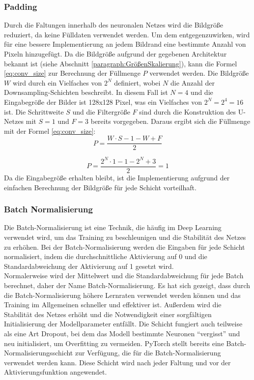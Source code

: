 \subsubsection{Padding}
Durch die Faltungen innerhalb des neuronalen Netzes wird die Bildgröße reduziert, da keine Fülldaten verwendet werden. Um dem entgegenzuwirken, wird für eine bessere Implementierung an jedem Bildrand eine bestimmte Anzahl von Pixeln hinzugefügt. Da die Bildgröße aufgrund der gegebenen Architektur bekannt ist (siehe Abschnitt \ref{paragraph:GrößenSkalierung}), kann die Formel \ref{eq:conv_size} zur Berechnung der Füllmenge $P$ verwendet werden. Die Bildgröße $W$ wird durch ein Vielfaches von $2^N$ definiert, wobei $N$ die Anzahl der Downsampling-Schichten beschreibt. In diesem Fall ist $N=4$ und die Eingabegröße der Bilder ist 128x128 Pixel, was ein Vielfaches von $2^N=2^4=16$ ist. Die Schrittweite $S$ und die Filtergröße $F$ sind durch die Konstruktion des U-Netzes mit $S=1$ und $F=3$ bereits vorgegeben. Daraus ergibt sich die Füllmenge mit der Formel \ref{eq:conv_size}:
\begin{equation}
	P = \dfrac{W \cdot S - 1 - W + F}{2}
\end{equation}

\begin{equation}
	P = \dfrac{2^N \cdot 1 - 1 - 2^N + 3}{2}  = 1
\end{equation}
Da die Eingabegröße erhalten bleibt, ist die Implementierung aufgrund der einfachen Berechnung der Bildgröße für jede Schicht vorteilhaft.

\subsubsection{Batch Normalisierung}
Die Batch-Normalisierung ist eine Technik, die häufig im Deep Learning verwendet wird, um das Training zu beschleunigen und die Stabilität des Netzes zu erhöhen. Bei der Batch-Normalisierung werden die Eingaben für jede Schicht normalisiert, indem die durchschnittliche Aktivierung auf 0 und die Standardabweichung der Aktivierung auf 1 gesetzt wird.\\
Normalerweise wird der Mittelwert und die Standardabweichung für jede Batch berechnet, daher der Name Batch-Normalisierung. Es hat sich gezeigt, dass durch die Batch-Normalisierung höhere Lernraten verwendet werden können und das Training im Allgemeinen schneller und effektiver ist. Außerdem wird die Stabilität des Netzes erhöht und die Notwendigkeit einer sorgfältigen Initialisierung der Modellparameter entfällt. Die Schicht fungiert auch teilweise als eine Art Dropout, bei dem das Modell bestimmte Neuronen ``vergisst'' und neu initialisiert, um Overfitting zu vermeiden.\cite[vgl.][]{Ioffe2015}
PyTorch stellt bereits eine Batch-Normalisierungsschicht zur Verfügung, die für die Batch-Normalisierung verwendet werden kann. Diese Schicht wird nach jeder Faltung und vor der Aktivierungsfunktion angewendet.

